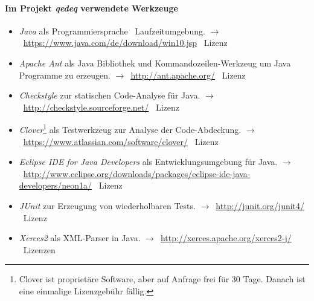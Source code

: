 \documentclass[english,ngerman,parskip=half,headsepline,footsepline]{scrreprt}
\newcounter{Enumi}
\begin{document}
	\paragraph{Im Projekt \emph{qedeq} verwendete Werkzeuge}
	\begin{itemize}
		\setcounter{enumi}{\value{Enumi}}

		\item\label{Werkzeug:Java}\emph{Java} als Programmiersprache \textendash\ Laufzeitumgebung. $\rightarrow$~\url{https://www.java.com/de/download/win10.jsp} \textendash\ Lizenz \seename~\cite{bib:JavaSE}

		\item\label{Werkzeug:Apache Ant}\emph{Apache Ant} als Java Bibliothek und Kommandozeilen-Werkzeug um Java Programme zu erzeugen. $\rightarrow$~\url{http://ant.apache.org/} \textendash\ Lizenz \seename~\cite{bib:Apacheii}

		\item\label{Werkzeug:Checkstyle}\emph{Checkstyle} zur statischen Code-Analyse für Java. $\rightarrow$~\url{http://checkstyle.sourceforge.net/} \textendash\ Lizenz \seename~\cite{bib:LGPLii}

		\item\label{Werkzeug:Clover}\emph{Clover}\footnote{Clover ist proprietäre Software, aber auf Anfrage frei für 30 Tage. Danach ist eine einmalige Lizenzgebühr fällig.} als Testwerkzeug zur Analyse der Code-Abdeckung. $\rightarrow$~\url{https://www.atlassian.com/software/clover/} \textendash\ Lizenz \seename~\cite{bib:Clover}

		\item\label{Werkzeug:Eclipse Java}\emph{Eclipse IDE for Java Developers} als Entwicklungsumgebung für Java. $\rightarrow$~\url{http://www.eclipse.org/downloads/packages/eclipse-ide-java-developers/neon1a/} \textendash\ Lizenz \seename~\cite{bib:OSI}

		\item\label{Werkzeug:JUnit}\emph{JUnit} zur Erzeugung von wiederholbaren Tests. $\rightarrow$~\url{http://junit.org/junit4/} \textendash\ Lizenz \seename~\cite{bib:EPL}

		\item\label{Werkzeug:Xerces2}\emph{Xerces2} als XML-Parser in Java. $\rightarrow$~\url{http://xerces.apache.org/xerces2-j/} \textendash\ Lizenzen \seename~\cite{bib:Apacheii, bib:SAX, bib:WDCDL, bib:WDCSNL}

		\setcounter{Enumi}{\value{enumi}}
	\end{itemize}
\end{document}
